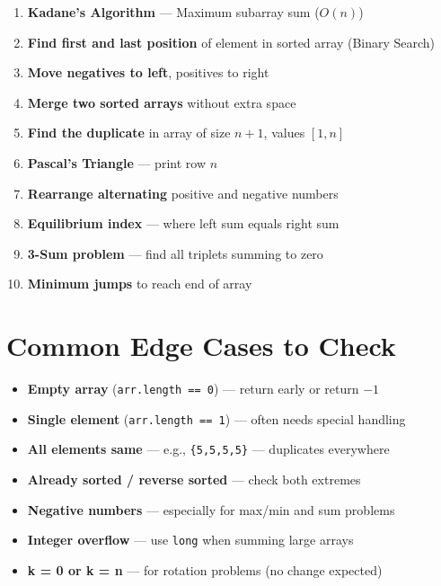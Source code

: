 \documentclass[12pt,a4paper,oneside]{book}
\begin{document}
\begin{interviewcorner}
\begin{enumerate}
  \item \textbf{Kadane's Algorithm} --- Maximum subarray sum ($O(n)$)
  \item \textbf{Find first and last position} of element in sorted array (Binary Search)
  \item \textbf{Move negatives to left}, positives to right
  \item \textbf{Merge two sorted arrays} without extra space
  \item \textbf{Find the duplicate} in array of size $n+1$, values $[1,n]$
  \item \textbf{Pascal's Triangle} --- print row $n$
  \item \textbf{Rearrange alternating} positive and negative numbers
  \item \textbf{Equilibrium index} --- where left sum equals right sum
  \item \textbf{3-Sum problem} --- find all triplets summing to zero
  \item \textbf{Minimum jumps} to reach end of array
\end{enumerate}
\end{interviewcorner}

\section{Common Edge Cases to Check}

\begin{warningbox}
\begin{itemize}
  \item \textbf{Empty array} (\texttt{arr.length == 0}) --- return early or return $-1$
  \item \textbf{Single element} (\texttt{arr.length == 1}) --- often needs special handling
  \item \textbf{All elements same} --- e.g., \texttt{\{5,5,5,5\}} --- duplicates everywhere
  \item \textbf{Already sorted / reverse sorted} --- check both extremes
  \item \textbf{Negative numbers} --- especially for max/min and sum problems
  \item \textbf{Integer overflow} --- use \texttt{long} when summing large arrays
  \item \textbf{k = 0 or k = n} --- for rotation problems (no change expected)
\end{itemize}
\end{warningbox}
\end{document}
